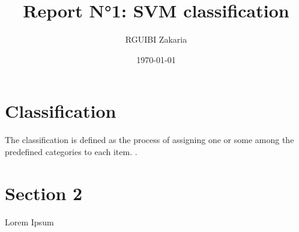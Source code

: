 \documentclass[11pt]{article}
\title{ Report N°1: SVM classification}
\author{ RGUIBI Zakaria }
\date{\today}
\begin{document}
\maketitle	
\pagebreak



\section{Classification }

The classification is defined as the process of assigning one or some among the predefined categories to each item. \cite{mlfoundation}.\\




\pagebreak
\section{Section 2}
Lorem Ipsum \\



\medskip

\printbibliography
\end{document}
